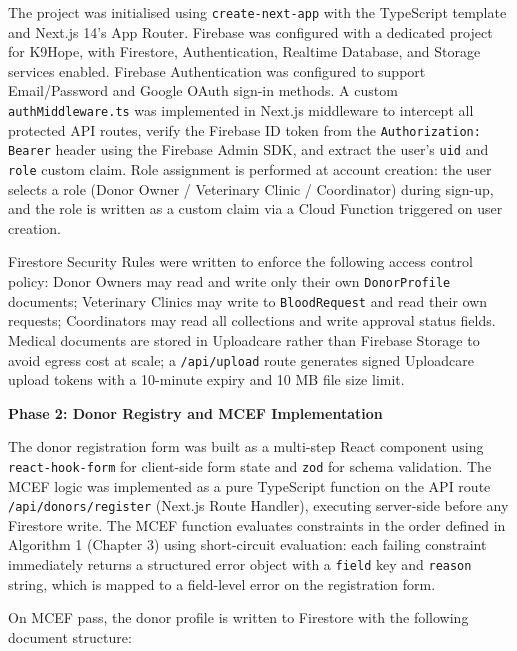 \documentclass[12pt,a4paper]{article}
\begin{document}
\noindent The project was initialised using \texttt{create-next-app} with the TypeScript template and Next.js 14's App Router. Firebase was configured with a dedicated project for K9Hope, with Firestore, Authentication, Realtime Database, and Storage services enabled. Firebase Authentication was configured to support Email/Password and Google OAuth sign-in methods. A custom \texttt{authMiddleware.ts} was implemented in Next.js middleware to intercept all protected API routes, verify the Firebase ID token from the \texttt{Authorization: Bearer} header using the Firebase Admin SDK, and extract the user's \texttt{uid} and \texttt{role} custom claim. Role assignment is performed at account creation: the user selects a role (Donor Owner / Veterinary Clinic / Coordinator) during sign-up, and the role is written as a custom claim via a Cloud Function triggered on user creation.

\noindent Firestore Security Rules were written to enforce the following access control policy: Donor Owners may read and write only their own \texttt{DonorProfile} documents; Veterinary Clinics may write to \texttt{BloodRequest} and read their own requests; Coordinators may read all collections and write approval status fields. Medical documents are stored in Uploadcare rather than Firebase Storage to avoid egress cost at scale; a \texttt{/api/upload} route generates signed Uploadcare upload tokens with a 10-minute expiry and 10 MB file size limit.

\vspace{1.2em}
\noindent\textbf{Phase 2: Donor Registry and MCEF Implementation}
\vspace{0.5em}

\noindent The donor registration form was built as a multi-step React component using \texttt{react-hook-form} for client-side form state and \texttt{zod} for schema validation. The MCEF logic was implemented as a pure TypeScript function on the API route \texttt{/api/donors/register} (Next.js Route Handler), executing server-side before any Firestore write. The MCEF function evaluates constraints in the order defined in Algorithm 1 (Chapter 3) using short-circuit evaluation: each failing constraint immediately returns a structured error object with a \texttt{field} key and \texttt{reason} string, which is mapped to a field-level error on the registration form.

\noindent On MCEF pass, the donor profile is written to Firestore with the following document structure:
\end{document}
